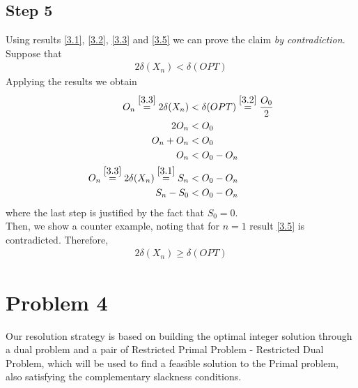 \documentclass[a4paper,11pt]{article}
\begin{document}
\subsection{Step 5}
Using results \ref{3.1}, \ref{3.2}, \ref{3.3} and \ref{3.5} we can prove the claim \textit{by contradiction}. Suppose that
\begin{align*}
2\delta(X_n) < \delta(OPT)
\end{align*}
Applying the results we obtain
\begin{align*}
O_n \overset{\ref{3.3}}{=} 2\delta(X_n) &< \delta(OPT) \overset{\ref{3.2}}{=} \dfrac{O_0}{2}\\
2O_n &<  O_0\\
O_n + O_n &<  O_0\\
O_n &< O_0 - O_n\\
O_n \overset{\ref{3.3}}{=} 2\delta(X_n) \overset{\ref{3.1}}{=} S_n &< O_0 - O_n\\
S_n - S_0 &< O_0 - O_n
\end{align*}
where the last step is justified by the fact that $S_0 = 0$.\\
Then, we show a counter example, noting that for $n=1$ result \ref{3.5} is contradicted. Therefore,
\begin{align*}
2\delta(X_n) \geq \delta(OPT)
\end{align*}


\newpage
\section{Problem 4}
Our resolution strategy is based on building the optimal integer solution through a dual problem and a pair of Restricted Primal Problem - Restricted Dual Problem, which will be used to find a feasible solution to the Primal problem, also satisfying the complementary slackness conditions.\\
\end{document}
